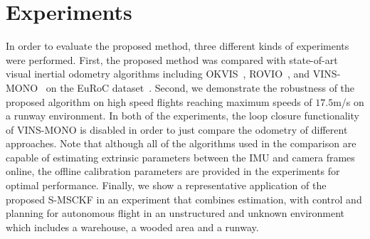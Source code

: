 \section{Experiments}
\label{sec: experiments}
In order to evaluate the proposed method, three different kinds of experiments were performed. First, the proposed method was compared with  state-of-art visual inertial odometry algorithms including OKVIS~\cite{leutenegger2015keyframe}, ROVIO~\cite{bloesch2015robust}, and VINS-MONO~\cite{vins-mono} on the EuRoC dataset~\cite{burri2016euroc}. Second, we demonstrate the robustness of the proposed algorithm on high speed flights reaching maximum speeds of $17.5$m/s on a runway environment. In both of the experiments, the loop closure functionality of VINS-MONO is disabled in order to just compare the odometry of different approaches. Note that although all of the algorithms used in the comparison are capable of estimating extrinsic parameters between the IMU and camera frames online, the offline calibration parameters are provided in the experiments for optimal performance. Finally, we show a representative application of the proposed S-MSCKF in an experiment that combines estimation, with control and planning for autonomous flight in an unstructured and unknown environment which includes a warehouse, a wooded area and a runway.



